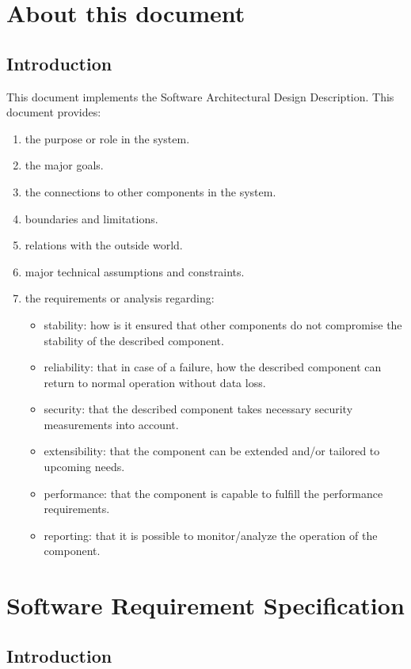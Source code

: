 \documentclass{scrreprt}
\begin{document}
\part{About this document}
\chapter{Introduction}
This document implements the Software Architectural Design Description.
This document provides:
\begin{enumerate}
    \item the purpose or role in the system.
    \item the major goals.
    \item the connections to other components in the system.
    \item boundaries and limitations.
    \item relations with the outside world.
    \item major technical assumptions and constraints.
    \item the requirements or analysis regarding:
    \begin{itemize}
        \item stability: how is it ensured that other components do not 
                    compromise the stability of the described component.
        \item reliability: that in case of a failure, how the described 
                    component can return to normal operation without data loss.
        \item security: that the described component takes necessary security measurements into account.
        \item extensibility: that the component can be extended and/or tailored to upcoming needs.
        \item performance: that the component is capable to fulfill the performance requirements.
        \item reporting: that it is possible to monitor/analyze the operation of the component.
    \end{itemize}
\end{enumerate}

\part{Software Requirement Specification}
\chapter{Introduction}
\end{document}
